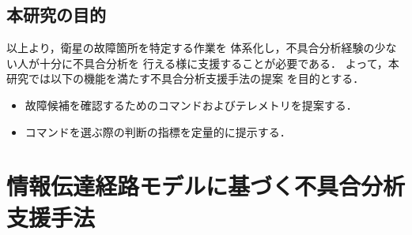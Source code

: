 \documentclass[11pt]{jsarticle}%
\begin{document}
\begin{multicols}{2}
\subsection{本研究の目的}
\vspace{-1zh}
以上より，衛星の故障箇所を特定する作業を
体系化し，不具合分析経験の少ない人が十分に不具合分析を
行える様に支援することが必要である．
よって，本研究では以下の機能を満たす不具合分析支援手法の提案%
を目的とする．%
  \begin{itemize}
  \item 故障候補を確認するためのコマンドおよびテレメトリを提案する．
  \item コマンドを選ぶ際の判断の指標を定量的に提示する．
\end{itemize}
\vspace{-1zh}
\section{情報伝達経路モデルに基づく不具合分析支援手法}
\vspace{-1zh}

\end{multicols}
\end{document}
